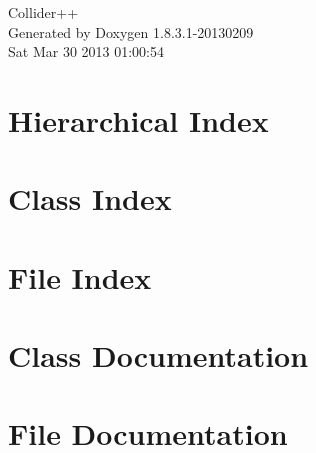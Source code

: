 \documentclass{book}
\begin{document}
\hypersetup{pageanchor=false,citecolor=blue}
\begin{titlepage}
\vspace*{7cm}
\begin{center}
{\Large Collider++ }\\
\vspace*{1cm}
{\large Generated by Doxygen 1.8.3.1-20130209}\\
\vspace*{0.5cm}
{\small Sat Mar 30 2013 01:00:54}\\
\end{center}
\end{titlepage}
\clearemptydoublepage
{}
\tableofcontents
\clearemptydoublepage
{}
\hypersetup{pageanchor=true,citecolor=blue}
\chapter{Hierarchical Index}

\chapter{Class Index}

\chapter{File Index}

\chapter{Class Documentation}








\chapter{File Documentation}






\printindex
\end{document}
